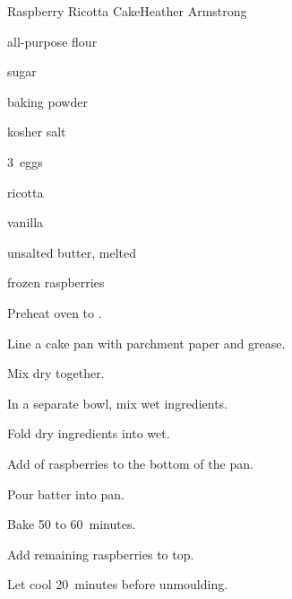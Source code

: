 \begin{recipe}{Raspberry Ricotta Cake}{Heather Armstrong}{}

\begin{ingredients}
\item \C{1\half} all-purpose flour
\item {} sugar
\item {} baking powder
\item \tp{\threequarter} kosher salt
\item 3~eggs
\item \C{1\half} ricotta
\item \tp{\half} vanilla
\item \C{\half} unsalted butter, melted
\item \C{1\quarter} frozen raspberries
\end{ingredients}

\begin{directions}
\item Preheat oven to .
\item Line a  cake pan with parchment paper and grease.
\item Mix dry together.
\item In a separate bowl, mix wet ingredients.
\item Fold dry ingredients into wet.
\item Add  of raspberries to the bottom of the pan.
\item Pour batter into pan.
\item Bake 50 to 60~minutes.
\item Add remaining raspberries to top.
\item Let cool 20~minutes before unmoulding.
\end{directions}

\end{recipe}
